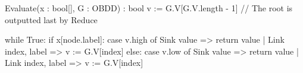 \begin{blstlisting}
  Evaluate(x : bool[], G : OBDD) : bool
    v := G.V[G.V.length - 1] // The root is outputted last by Reduce

    while True:
      if x[node.label]:
        case v.high of Sink{ value }        => return value
                     | Link{ index, label } => v := G.V[index]
      else:
        case v.low of Sink{ value }         => return value
                    | Link{ index, label }  => v := G.V[index]
\end{blstlisting}
